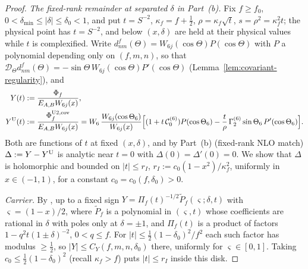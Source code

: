 \documentclass[11pt]{article}
\theoremstyle{definition}
\theoremstyle{remark}
\newcommand{\cD}{\mathcal{D}}
\newcommand{\cC}{\mathcal{C}}
\renewcommand{\_}{\oldunderscore\penalty0\hskip0pt\relax}
\begin{document}
\begin{proof}
\emph{The fixed-rank remainder at separated $\delta$ in Part~(b).}  Fix $f\ge f_0$, $0<\delta_{\min}\le|\delta|\le\delta_0<1$, and put $t=S^{-2}$, $\kappa_f=f+\frac12$, $\rho=\kappa_f\sqrt t$, $s=\rho^2=\kappa_f^2t$; the physical point has $t=S^{-2}$, and below $(x,\delta)$ are held at their physical values while $t$ is complexified.  Write $d^f_{nm}(\Theta)=W_{6j}(\cos\Theta)P(\cos\Theta)$ with $P$ a polynomial depending only on $(f,m,n)$, so that $\cD_\Theta d^f_{nm}(\Theta)=-\sin\Theta\,W_{6j}(\cos\Theta)P'(\cos\Theta)$ (Lemma~\ref{lem:covariant-regularity}), and
\begin{equation}
 \begin{aligned}
 Y(t)&:=\frac{\Phi_f}{E_{A,B}W_{6j}(x)},\\
 Y^{\rm U}(t)&:=\frac{\Phi_f^{\mathrm{U2,cov}}}{E_{A,B}W_{6j}(x)}=W_6\,\frac{W_{6j}(\cos\Theta_6)}{W_{6j}(x)}\Bigl[(1+t\,\cC_0^{(6)})P(\cos\Theta_6)-\frac t\rho\,\Gamma_2^{(6)}\sin\Theta_6\,P'(\cos\Theta_6)\Bigr].
 \end{aligned}
\end{equation}
Both are functions of $t$ at fixed $(x,\delta)$, and by Part~(b) (fixed-rank NLO match) $\Delta:=Y-Y^{\rm U}$ is analytic near $t=0$ with $\Delta(0)=\Delta'(0)=0$.  We show that $\Delta$ is holomorphic and bounded on $|t|\le r_I$, $r_I:=c_0(1-x^2)/\kappa_f^2$, uniformly in $x\in(-1,1)$, for a constant $c_0=c_0(f,\delta_0)>0$.

\emph{Carrier.}  By \cite[Theorem~10.1(b) and its proof]{LewisFixedRank}, up to a fixed sign $Y=\Pi_f(t)^{-1/2}\widetilde P_f(\varsigma;\delta,t)$ with $\varsigma=(1-x)/2$, where $\widetilde P_f$ is a polynomial in $(\varsigma,t)$ whose coefficients are rational in $\delta$ with poles only at $\delta=\pm1$, and $\Pi_f(t)$ is a product of factors $1-q^2t(1\pm\delta)^{-2}$, $0<q\le f$.  For $|t|\le\frac12(1-\delta_0)^2/f^2$ each such factor has modulus $\ge\frac12$, so $|Y|\le C_Y(f,m,n,\delta_0)$ there, uniformly for $\varsigma\in[0,1]$.  Taking $c_0\le\frac12(1-\delta_0)^2$ (recall $\kappa_f>f$) puts $|t|\le r_I$ inside this disk.


\end{proof}
\end{document}
